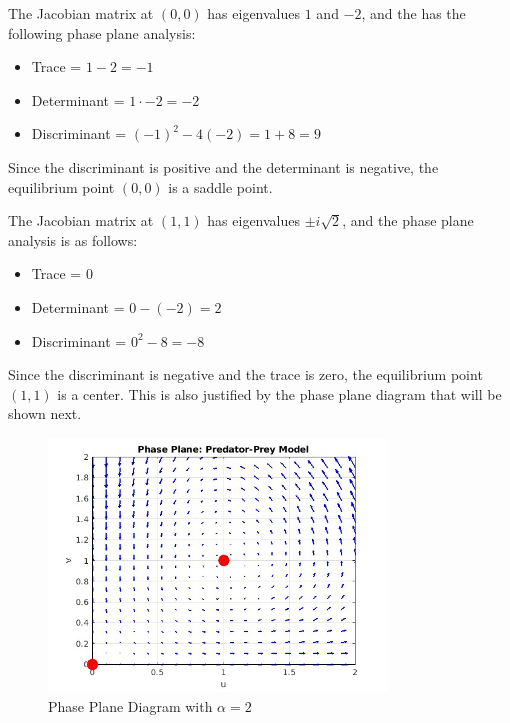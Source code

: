 \documentclass[10pt]{beamer}
\begin{document}
\begin{frame}
    The Jacobian matrix at $(0, 0)$ has eigenvalues $1$ and $-2$, and the has the
    following phase plane analysis:
    \begin{itemize}
        \item Trace = $1 - 2 = -1$
        \item Determinant = $1 \cdot -2 = -2$
        \item Discriminant = $(-1)^2 - 4(-2) = 1 + 8 = 9$
    \end{itemize}

    Since the discriminant is positive and the determinant is negative, the
    equilibrium point $(0, 0)$ is a saddle point.
\end{frame}

\begin{frame}
    The Jacobian matrix at $(1, 1)$ has eigenvalues $\pm i\sqrt{2}$, and the phase
    plane analysis is as follows:
    \begin{itemize}
        \item Trace = $0$
        \item Determinant = $0 - (-2) = 2$
        \item Discriminant = $0^2 - 8 = -8$
    \end{itemize}

    Since the discriminant is negative and the trace is zero, the equilibrium point
    $(1, 1)$ is a center. This is also justified by the phase plane diagram that will be shown next.
\end{frame}

\begin{frame}
    \begin{figure}
        \centering
        \includegraphics[width=0.8\textwidth]{plot.jpg}
        \caption{Phase Plane Diagram with $\alpha=2$}
    \end{figure}
\end{frame}
\end{document}
